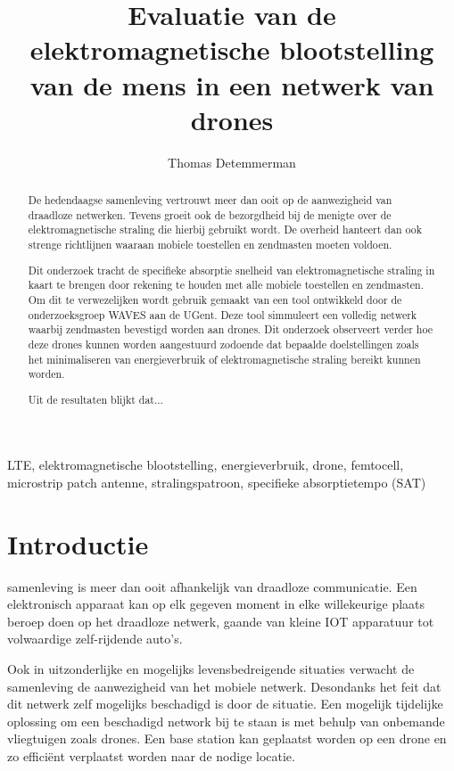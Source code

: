 \documentclass[twocolumn]{phdsymp} %
\begin{document}
\title{	Evaluatie van de elektromagnetische blootstelling van de mens in een netwerk van drones}

\author{Thomas Detemmerman}


\maketitle

\begin{abstract}
De hedendaagse samenleving vertrouwt meer dan ooit op de aanwezigheid van draadloze netwerken. 
Tevens groeit ook de bezorgdheid bij de menigte over de elektromagnetische straling die hierbij gebruikt wordt. De overheid hanteert dan ook
strenge richtlijnen waaraan mobiele toestellen en zendmasten moeten voldoen.

Dit onderzoek tracht de specifieke absorptie snelheid van elektromagnetische straling in kaart te brengen door rekening te houden met alle mobiele 
toestellen en zendmasten. Om dit te verwezelijken wordt gebruik gemaakt van een tool ontwikkeld door de onderzoeksgroep WAVES aan de UGent. Deze tool
simmuleert een volledig netwerk waarbij zendmasten bevestigd worden aan drones. Dit onderzoek observeert verder hoe deze drones kunnen worden aangestuurd
zodoende dat bepaalde doelstellingen zoals het minimaliseren van energieverbruik of elektromagnetische straling bereikt kunnen worden.

Uit de resultaten blijkt dat...
\end{abstract}

\begin{keywords}
LTE, elektromagnetische blootstelling, energieverbruik, drone, femtocell, microstrip patch antenne, stralingspatroon, specifieke absorptietempo (SAT)
\end{keywords}

\section{Introductie}
 samenleving is meer dan ooit afhankelijk van draadloze communicatie.
Een elektronisch apparaat kan op elk gegeven moment in elke willekeurige plaats beroep doen 
op het draadloze netwerk, gaande van kleine \gls{IOT} apparatuur tot volwaardige zelf-rijdende auto's.

Ook in uitzonderlijke en mogelijks levensbedreigende situaties verwacht de samenleving de aanwezigheid 
van het mobiele netwerk. Desondanks het feit dat dit netwerk zelf mogelijks beschadigd is door de situatie.
Een mogelijk tijdelijke oplossing om een beschadigd network bij te staan is met behulp van onbemande vliegtuigen zoals drones.
Een base station kan geplaatst worden op een drone en zo effici\"ent verplaatst worden naar de nodige locatie.
\end{document}
